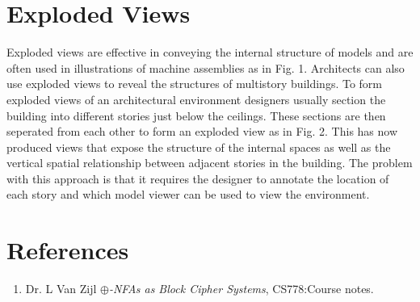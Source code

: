 \documentclass[a4paper,11pt,titlepage]{article}
\begin{document}
\section {Exploded Views}
Exploded views are effective in conveying the internal structure of models and are often used in illustrations of machine assemblies as in Fig. 1. Architects can also use exploded views to reveal the structures of multistory buildings. To form exploded views of an architectural environment designers usually section the building into different stories just below the ceilings. These sections are then seperated from each other to form an exploded view as in Fig. 2. This has now produced views that expose the structure of the internal spaces as well as the vertical spatial relationship between adjacent stories in the building. The problem with this approach is that it requires the designer to annotate the location of each story and which model viewer can be used to view the environment.

\section{References}
\begin{enumerate}
\item Dr. L Van Zijl
\emph{$\oplus$-NFAs as Block Cipher Systems}, CS778:Course notes.
\end{enumerate}
\end{document}
